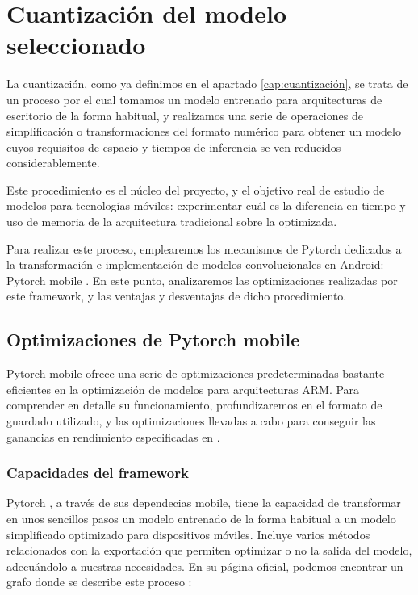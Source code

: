 \chapter{Cuantización del modelo seleccionado}

La cuantización, como ya definimos en el apartado \ref{cap:cuantización}, se trata de un proceso por el cual tomamos un modelo entrenado para arquitecturas de escritorio de la forma habitual, y realizamos una serie de operaciones de simplificación o transformaciones del formato numérico para obtener un modelo cuyos requisitos de espacio y tiempos de inferencia se ven reducidos considerablemente. 

Este procedimiento es el núcleo del proyecto, y el objetivo real de estudio de modelos para tecnologías móviles: experimentar cuál es la diferencia en tiempo y uso de memoria de la arquitectura tradicional sobre la optimizada.

Para realizar este proceso, emplearemos los mecanismos de Pytorch\cite{paszke2019pytorch} dedicados a la transformación e implementación de modelos convolucionales en Android: Pytorch mobile  \cite{pmobile}. En este punto, analizaremos las optimizaciones realizadas por este framework, y las ventajas y desventajas de dicho procedimiento.

\section{Optimizaciones de Pytorch mobile}

Pytorch mobile ofrece una serie de optimizaciones predeterminadas bastante eficientes en la optimización de modelos para arquitecturas ARM. Para comprender en detalle su funcionamiento, profundizaremos en el formato de guardado utilizado, y las optimizaciones llevadas a cabo para conseguir las ganancias en rendimiento especificadas en \cite{pmobile}.

\subsection{Capacidades del framework}
Pytorch \cite{paszke2019pytorch}, a través de sus dependecias mobile, tiene la capacidad de transformar en unos sencillos pasos un modelo entrenado de la forma habitual a un modelo simplificado optimizado para dispositivos móviles. Incluye varios métodos relacionados con la exportación que permiten optimizar o no la salida del modelo, adecuándolo a nuestras necesidades. En su página oficial, podemos encontrar un grafo donde se describe este proceso \cite{pmobile}:

